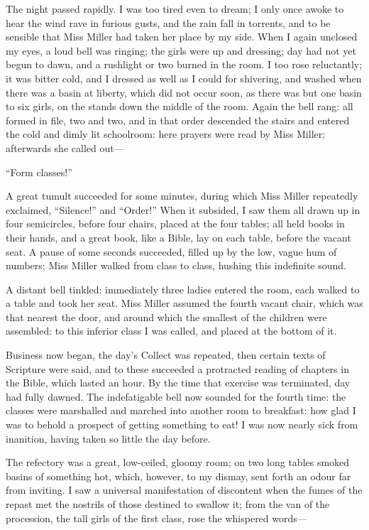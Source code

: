 The night passed rapidly. I was too tired even to dream; I only once
awoke to hear the wind rave in furious gusts, and the rain fall in
torrents, and to be sensible that Miss Miller had taken her place by my
side. When I again unclosed my eyes, a loud bell was ringing; the girls
were up and dressing; day had not yet begun to dawn, and a rushlight or
two burned in the room. I too rose reluctantly; it was bitter cold, and
I dressed as well as I could for shivering, and washed when there was a
basin at liberty, which did not occur soon, as there was but one basin
to six girls, on the stands down the middle of the room. Again the bell
rang: all formed in file, two and two, and in that order descended the
stairs and entered the cold and dimly lit schoolroom: here prayers were
read by Miss Miller; afterwards she called out---

\enquote{Form classes!}

A great tumult succeeded for some minutes, during which Miss Miller
repeatedly exclaimed, \enquote{Silence!} and \enquote{Order!} When it
subsided, I saw them all drawn up in four semicircles, before four
chairs, placed at the four tables; all held books in their hands, and a
great book, like a Bible, lay on each table, before the vacant seat. A
pause of some seconds succeeded, filled up by the low, vague hum of
numbers; Miss Miller walked from class to class, hushing this indefinite
sound.

A distant bell tinkled: immediately three ladies entered the room, each
walked to a table and took her seat. Miss Miller assumed the fourth
vacant chair, which was that nearest the door, and around which the
smallest of the children were assembled: to this inferior class I was
called, and placed at the bottom of it.

Business now began, the day's Collect was repeated, then certain texts
of Scripture were said, and to these succeeded a protracted reading of
chapters in the Bible, which lasted an hour. By the time that exercise
was terminated, day had fully dawned. The indefatigable bell now
sounded for the fourth time: the classes were marshalled and marched
into another room to breakfast: how glad I was to behold a prospect of
getting something to eat! I was now nearly sick from inanition, having
taken so little the day before.

The refectory was a great, low-ceiled, gloomy room; on two long tables
smoked basins of something hot, which, however, to my dismay, sent forth
an odour far from inviting. I saw a universal manifestation of
discontent when the fumes of the repast met the nostrils of those
destined to swallow it; from the van of the procession, the tall girls
of the first class, rose the whispered words---

